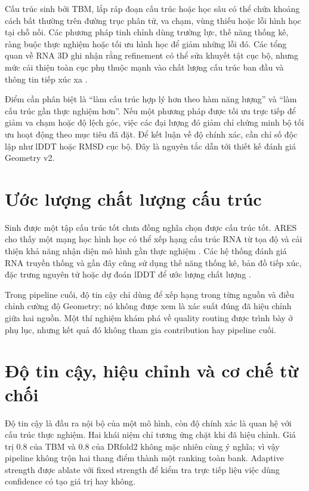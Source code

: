 \documentclass[12pt,a4paper,oneside]{report}
\begin{document}
Cấu trúc sinh bởi TBM, lắp ráp đoạn cấu trúc hoặc học sâu có thể chứa khoảng cách bất
thường trên đường trục phân tử, va chạm, vùng thiếu hoặc lỗi hình học tại chỗ nối. Các phương pháp tinh chỉnh
dùng trường lực, thế năng thống kê, ràng buộc thực nghiệm hoặc tối ưu hình học để giảm
những lỗi đó. Các tổng quan về RNA 3D ghi nhận rằng refinement có thể sửa khuyết tật
cục bộ, nhưng mức cải thiện toàn cục phụ thuộc mạnh vào chất lượng cấu trúc ban đầu và
thông tin tiếp xúc xa \cite{rna_progress_review}.

Điểm cần phân biệt là ``làm cấu trúc hợp lý hơn theo hàm năng lượng'' và ``làm cấu trúc
gần thực nghiệm hơn''. Nếu một phương pháp được tối ưu trực tiếp để giảm va chạm hoặc
độ lệch góc, việc các đại lượng đó giảm chỉ chứng minh bộ tối ưu hoạt động theo mục tiêu
đã đặt. Để kết luận về độ chính xác, cần chỉ số độc lập như lDDT hoặc RMSD cục bộ. Đây
là nguyên tắc dẫn tới thiết kế đánh giá Geometry v2.

\section{Ước lượng chất lượng cấu trúc}

Sinh được một tập cấu trúc tốt chưa đồng nghĩa chọn được cấu trúc tốt. ARES cho thấy một
mạng học hình học có thể xếp hạng cấu trúc RNA từ tọa độ và cải thiện khả năng nhận diện
mô hình gần thực nghiệm \cite{ares}. Các hệ thống đánh giá RNA truyền thống và gần đây
cũng sử dụng thế năng thống kê, bản đồ tiếp xúc, đặc trưng nguyên tử hoặc dự đoán lDDT để
ước lượng chất lượng \cite{rnassess,ares}.

Trong pipeline cuối, độ tin cậy chỉ dùng để xếp hạng trong từng nguồn và điều chỉnh
cường độ Geometry; nó không được xem là xác suất đúng đã hiệu chỉnh giữa hai nguồn.
Một thí nghiệm khám phá về quality routing được trình bày ở phụ lục, nhưng kết quả đó
không tham gia contribution hay pipeline cuối.

\section{Độ tin cậy, hiệu chỉnh và cơ chế từ chối}

Độ tin cậy là đầu ra nội bộ của một mô hình, còn độ chính xác là quan hệ với cấu trúc
thực nghiệm. Hai khái niệm chỉ tương ứng chặt khi đã hiệu chỉnh. Giá trị 0.8 của TBM và
0.8 của DRfold2 không mặc nhiên cùng ý nghĩa; vì vậy pipeline không trộn hai thang điểm
thành một ranking toàn bank. Adaptive strength được ablate với fixed strength để kiểm
tra trực tiếp liệu việc dùng confidence có tạo giá trị hay không.
\end{document}
